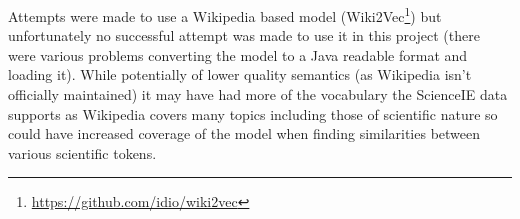 Attempts were made to use a Wikipedia based model (Wiki2Vec\footnote{\href{https://github.com/idio/wiki2vec}{https://github.com/idio/wiki2vec}}) but unfortunately no successful attempt was made to use it in this project (there were various problems converting the model to a Java readable format and loading it). While potentially of lower quality semantics (as Wikipedia isn't officially maintained) it may have had more of the vocabulary the ScienceIE data supports as Wikipedia covers many topics including those of scientific nature so could have increased coverage of the model when finding similarities between various scientific tokens. 

